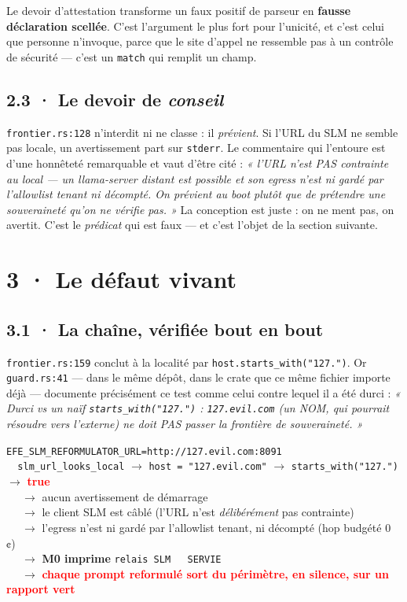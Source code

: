 \documentclass[10pt]{article}
\newcommand{\pire}[1]{\textcolor{red}{\textbf{#1}}}
\newcommand{\code}[1]{\texttt{\small #1}}
\newcommand{\fl}{$\rightarrow$}
\begin{document}
\begin{these}
Le devoir d'attestation transforme un faux positif de parseur en \textbf{fausse déclaration scellée}.
C'est l'argument le plus fort pour l'unicité, et c'est celui que personne n'invoque, parce que le
site d'appel ne ressemble pas à un contrôle de sécurité --- c'est un \code{match} qui remplit un
champ.
\end{these}

\subsection{2.3 · Le devoir de \emph{conseil}}

\code{frontier.rs:128} n'interdit ni ne classe : il \emph{prévient}. Si l'URL du SLM ne semble pas
locale, un avertissement part sur \code{stderr}. Le commentaire qui l'entoure est d'une honnêteté
remarquable et vaut d'être cité : \emph{« l'URL n'est PAS contrainte au local --- un llama-server
distant est possible et son egress n'est ni gardé par l'allowlist tenant ni décompté. On prévient au
boot plutôt que de prétendre une souveraineté qu'on ne vérifie pas. »} La conception est juste : on
ne ment pas, on avertit. C'est le \emph{prédicat} qui est faux --- et c'est l'objet de la section
suivante.

\section{3 · Le défaut vivant}

\subsection{3.1 · La chaîne, vérifiée bout en bout}

\code{frontier.rs:159} conclut à la localité par \code{host.starts\_with("127.")}. Or
\code{guard.rs:41} --- dans le même dépôt, dans le crate que ce même fichier importe déjà ---
documente précisément ce test comme celui contre lequel il a été durci : \emph{« Durci vs un naïf
\code{starts\_with("127.")} : \code{127.evil.com} (un NOM, qui pourrait résoudre vers l'externe) ne
doit PAS passer la frontière de souveraineté. »}

\begin{extrait}
\code{EFE\_SLM\_REFORMULATOR\_URL=http://127.evil.com:8091} \\[3pt]
\code{\ \ slm\_url\_looks\_local} \fl{} \code{host = "127.evil.com"} \fl{} \code{starts\_with("127.")} \fl{} \pire{true} \\
\code{\ \ } \fl{} aucun avertissement de démarrage \\
\code{\ \ } \fl{} le client SLM est câblé (l'URL n'est \emph{délibérément} pas contrainte) \\
\code{\ \ } \fl{} l'egress n'est ni gardé par l'allowlist tenant, ni décompté (hop budgété 0 ¢) \\
\code{\ \ } \fl{} \textbf{M0 imprime} \code{relais SLM \ \ SERVIE} \\
\code{\ \ } \fl{} \pire{chaque prompt reformulé sort du périmètre, en silence, sur un rapport vert}
\end{extrait}
\end{document}
